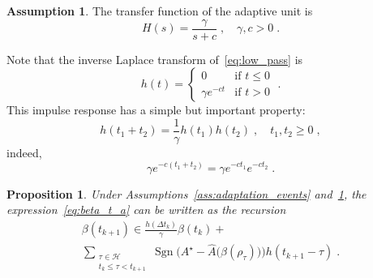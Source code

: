 \documentclass{article}
\newcommand{\AC}{\mathcal{A}}
\newcommand{\HH}{\mathcal{H}}
\DeclareMathOperator{\sgn}{Sgn}
\newtheorem{proposition}{Proposition}
\theoremstyle{definition}
\newtheorem{assumption}{Assumption}
\theoremstyle{remark}
\begin{document}
\begin{assumption} \label{ass:adaptive}
    The transfer function of the adaptive unit is
    \begin{equation} \label{eq:low_pass}
        H(s) = \frac{\gamma}{s+c} \;, \quad \gamma, c > 0 \;.
    \end{equation}
\end{assumption}

Note that the inverse Laplace transform of~\eqref{eq:low_pass} is
\begin{displaymath}
    h(t) = 
    \begin{cases}
                      0 & \text{if $t \le 0$} \\
        \gamma e^{-c t} & \text{if $t > 0$} 
    \end{cases} \;.
\end{displaymath}
This impulse response has a simple but important property:
\begin{equation} \label{eq:group_h}
    h(t_1 + t_2) = \frac{1}{\gamma}h(t_1)h(t_2) \;, \quad t_1, t_2 \ge 0 \;,
\end{equation}
indeed,
\begin{equation} \label{eq:h_1_order}
    \gamma e^{-c(t_1 + t_2)} = \gamma e^{-c t_1}e^{-c t_2} \;.
\end{equation}

\begin{proposition} \label{prop:recursion}
    Under Assumptions~\ref{ass:adaptation_events} and~\ref{ass:adaptive}, the expression~\eqref{eq:beta_t_a} can be written as the recursion
    \begin{multline} \label{eq:beta_recursion}
        \beta\left(t_{k+1}\right) \in \frac{h\left(\Delta t_k\right)}{\gamma}\beta\left(t_{k}\right) + \\
            \sum_{\substack{\tau \in \HH \\ t_{k} \le \tau < t_{k+1}}}\sgn\Big(A^\star-\hat{A}\big(\beta(\rho_\tau)\big)\Big)h\left(t_{k+1}-\tau\right) \;.
    \end{multline}
\end{proposition}
\end{document}

